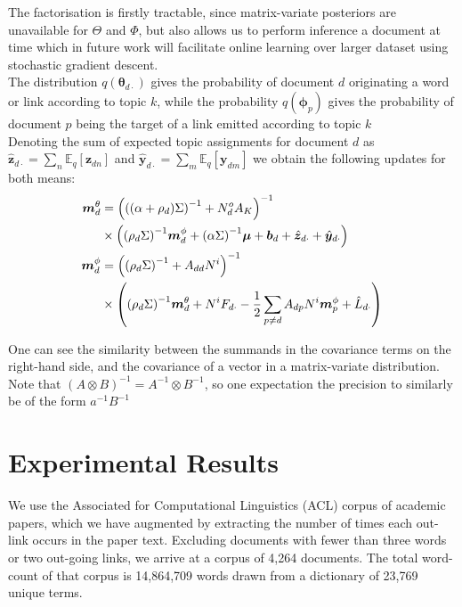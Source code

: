 \documentclass{sciposter}
\newcommand \ex[2] {
    \mathbb{E}_{ { #2 } }\left[ #1 \right]
}
\newcommand \halve[1] {
	\frac{#1}{2}
}
\newcommand \half {
    \halve{1}
}
\newcommand \vv[1] { \bm #1 }
\newcommand \inv[1] { {#1}^{-1} }
\newcommand \invb[1] { \inv{\left( #1 \right)} }
\newcommand \thdo { { \vv{\theta}_{d\cdot} } }
\begin{document}
\begin{multicols}{3}
The factorisation is firstly tractable, since matrix-variate posteriors are unavailable for $\Theta$ and $\Phi$, but also allows us to perform inference a document at time which in future work will facilitate online learning over larger dataset using stochastic gradient descent. \\

The distribution $q(\thdo)$ gives the probability of document $d$ originating a word or link according to topic $k$, while the probability $q(\vv{\phi}_p)$ gives the probability of document $p$ being the target of a link emitted according to topic $k$\\

Denoting the sum of expected topic assignments for document $d$ as $\hat{\vv{z}}_{d\cdot} = \sum_n \ex{\vv{z}_{dn}}{q}$ and $\hat{\vv{y}}_{d\cdot} = \sum_m \ex{\vv{y}_{dm}}{q}$ we obtain the following updates for both means:
\begin{align*}
\mtd &= \invb{ \invb{(\alpha + \rho_d)\Sigma} + N^o_d A_K } \\
    & \times
            \left(
                \invb{\rho_d \Sigma} \mpd
                + \invb{\alpha \Sigma}\vv{\mu}
                + \vv{b}_d 
                + \hat{\vv{z}}_{d\cdot}
                + \hat{\vv{y}}_{d\cdot}
            \right) \\
 \mpd & = \invb{\invb{\rho_d \Sigma} + A_{dd}N^i} \\
  & \times
             \left(
                 \invb{\rho_d \Sigma}\mtd + N^i F_{d\cdot} -\half \sum_{p \neq d} A_{dp} N^i \vv{m}^\phi_p + \hat{L}_{d\cdot}
             \right)
 \end{align*}
 
One can see the similarity between the summands in the covariance terms on the right-hand side, and the covariance of a vector in a matrix-variate distribution. Note that $\invb{A\otimes B} = \inv{A} \otimes \inv{B}$, so one expectation the precision to similarly be of the form $\inv{a}\inv{B}$

\section{Experimental Results}

We use the Associated for Computational Linguistics (ACL) corpus of academic papers, which we have augmented by extracting the number of times each out-link occurs in the paper text. Excluding documents with fewer than three words or two out-going links, we arrive at a corpus of 4,264 documents. The total word-count of that corpus is 14,864,709 words drawn from a dictionary of 23,769 unique terms.


\end{multicols}
\end{document}

